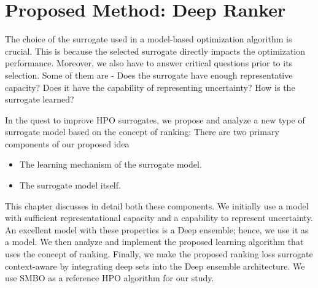 \documentclass[12pt, twoside, ngerman]{report}
\begin{document}

\chapter{Proposed Method: Deep Ranker}\label{chap:ProposedIdea}


The choice of the surrogate used in a model-based optimization algorithm is crucial. This is because the selected surrogate directly impacts the optimization performance.
Moreover, we also have to answer critical questions prior to its selection. Some of them are - Does the surrogate have enough representative capacity?
Does it have the capability of representing uncertainty?
How is the surrogate learned?

In the quest to improve HPO surrogates,  we propose and analyze a new type of surrogate model based on the concept of ranking:
There are two primary components of our proposed idea

\begin{itemize}
\item The learning mechanism of the surrogate model.
\item The surrogate model itself.
\end{itemize}

This chapter discusses in detail both these components.
We initially use a model with sufficient representational capacity and a capability to represent uncertainty.
An excellent model with these properties is a Deep ensemble; hence, we use it as a model.
We then analyze and implement the proposed learning algorithm that uses the concept of ranking.
Finally, we make the proposed ranking loss surrogate context-aware by integrating deep sets into the Deep ensemble architecture.
We use SMBO as a reference HPO algorithm for our study.
\end{document}

